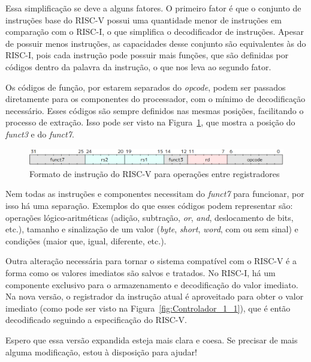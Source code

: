 \documentclass[
	12pt,				%
	openright,			%
	oneside,			%
	a4paper,			%
	english,			%
	french,				%
	spanish,			%
	brazil,				%
	]{abntex2}
\begin{document}
Essa simplificação se deve a alguns fatores. O primeiro fator é que o conjunto de instruções base do RISC-V possui uma quantidade menor de instruções em comparação com o RISC-I, o que simplifica o decodificador de instruções. Apesar de possuir menos instruções, as capacidades desse conjunto são equivalentes às do RISC-I, pois cada instrução pode possuir mais funções, que são definidas por códigos dentro da palavra da instrução, o que nos leva ao segundo fator.

Os códigos de função, por estarem separados do \textit{opcode}, podem ser passados diretamente para os componentes do processador, com o mínimo de decodificação necessário. Esses códigos são sempre definidos nas mesmas posições, facilitando o processo de extração. Isso pode ser visto na Figura~\ref{fig:risc-v_op_format}, que mostra a posição do \textit{funct3} e do \textit{funct7}.

\begin{figure}[h]
    \centering
    \includegraphics[width=1\linewidth]{ProcessoDesenvolvimento/Arquitetura/risc-v_op_format.png}
    \caption{Formato de instrução do RISC-V para operações entre registradores \cite{risc-v_risc-v_2024}}
    \label{fig:risc-v_op_format}
\end{figure}

Nem todas as instruções e componentes necessitam do \textit{funct7} para funcionar, por isso há uma separação. Exemplos do que esses códigos podem representar são: operações lógico-aritméticas (adição, subtração, \textit{or}, \textit{and}, deslocamento de bits, etc.), tamanho e sinalização de um valor (\textit{byte}, \textit{short}, \textit{word}, com ou sem sinal) e condições (maior que, igual, diferente, etc.).

Outra alteração necessária para tornar o sistema compatível com o RISC-V é a forma como os valores imediatos são salvos e tratados. No RISC-I, há um componente exclusivo para o armazenamento e decodificação do valor imediato. Na nova versão, o registrador da instrução atual é aproveitado para obter o valor imediato (como pode ser visto na Figura~\ref{fig:Controlador_1_1}), que é então decodificado seguindo a especificação do RISC-V.

Espero que essa versão expandida esteja mais clara e coesa. Se precisar de mais alguma modificação, estou à disposição para ajudar!
\end{document}
